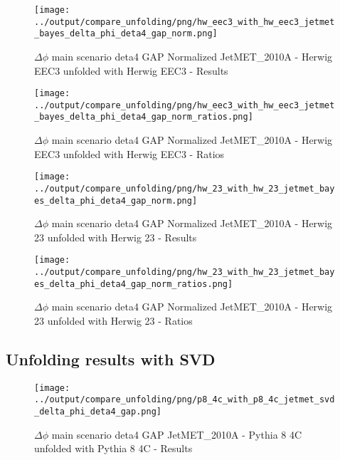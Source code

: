 \documentclass[11pt]{book}
\begin{document}
\begin{figure}[ht]
\centering
\texttt{[image: ../output/compare\_unfolding/png/hw\_eec3\_with\_hw\_eec3\_jetmet\_bayes\_delta\_phi\_deta4\_gap\_norm.png]}
\caption{$\Delta\phi$ main scenario deta4 GAP Normalized JetMET\_2010A - Herwig EEC3 unfolded with Herwig EEC3 - Results}
\label{hw_eec3_hw_eec3_jetmet_bayes_delta_phi_deta4_gap_norm_a}
\end{figure}

\begin{figure}[ht]
\centering
\texttt{[image: ../output/compare\_unfolding/png/hw\_eec3\_with\_hw\_eec3\_jetmet\_bayes\_delta\_phi\_deta4\_gap\_norm\_ratios.png]}
\caption{$\Delta\phi$ main scenario deta4 GAP Normalized JetMET\_2010A - Herwig EEC3 unfolded with Herwig EEC3 - Ratios}
\label{hw_eec3_hw_eec3_jetmet_bayes_delta_phi_deta4_gap_norm_b}
\end{figure}

\begin{figure}[ht]
\centering
\texttt{[image: ../output/compare\_unfolding/png/hw\_23\_with\_hw\_23\_jetmet\_bayes\_delta\_phi\_deta4\_gap\_norm.png]}
\caption{$\Delta\phi$ main scenario deta4 GAP Normalized JetMET\_2010A - Herwig 23 unfolded with Herwig 23 - Results}
\label{hw_23_hw_23_jetmet_bayes_delta_phi_deta4_gap_norm_a}
\end{figure}

\begin{figure}[ht]
\centering
\texttt{[image: ../output/compare\_unfolding/png/hw\_23\_with\_hw\_23\_jetmet\_bayes\_delta\_phi\_deta4\_gap\_norm\_ratios.png]}
\caption{$\Delta\phi$ main scenario deta4 GAP Normalized JetMET\_2010A - Herwig 23 unfolded with Herwig 23 - Ratios}
\label{hw_23_hw_23_jetmet_bayes_delta_phi_deta4_gap_norm_b}
\end{figure}



\clearpage
\subsection{Unfolding results with SVD}

\begin{figure}[ht]
\centering
\texttt{[image: ../output/compare\_unfolding/png/p8\_4c\_with\_p8\_4c\_jetmet\_svd\_delta\_phi\_deta4\_gap.png]}
\caption{$\Delta\phi$ main scenario deta4 GAP JetMET\_2010A - Pythia 8 4C unfolded with Pythia 8 4C - Results}
\label{p8_p8_jetmet_svd_delta_phi_deta4_gap_a}
\end{figure}
\end{document}
